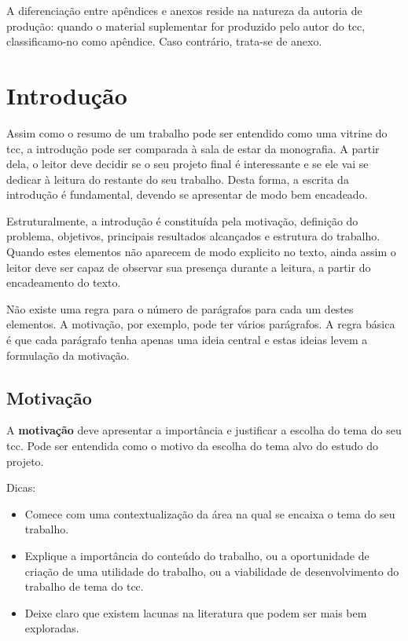 \documentclass{eic-bcc-tcc}
\begin{document}
A diferenciação entre apêndices e anexos reside na natureza da autoria de produção: quando o material suplementar for produzido pelo autor do \gls{tcc}, classificamo-no como apêndice. Caso contrário, trata-se de anexo.


\chapter{Introdução}
\label{cha:introducao}

Assim como o resumo de um trabalho pode ser entendido como uma vitrine do \gls{tcc}, a introdução pode ser comparada à sala de estar da monografia. A partir dela, o leitor deve decidir se o seu projeto final é interessante e se ele vai se dedicar à leitura do restante do seu trabalho. Desta forma, a escrita da introdução é fundamental, devendo se apresentar de modo bem encadeado.

Estruturalmente, a introdução é constituída pela motivação, definição do problema, objetivos, principais resultados alcançados e estrutura do trabalho. Quando estes elementos não aparecem de modo explicito no texto, ainda assim o leitor deve ser capaz de observar sua presença durante a leitura, a partir do encadeamento do texto.

Não existe uma regra para o número de parágrafos para cada um destes elementos. A motivação, por exemplo, pode ter vários parágrafos. A regra básica é que cada parágrafo tenha apenas uma ideia central e estas ideias levem a formulação da motivação.

\section{Motivação}

A \textbf{motivação} deve apresentar a importância e justificar a escolha do tema do seu \gls{tcc}. Pode ser entendida como o motivo da escolha do tema alvo do estudo do projeto. 

Dicas:
\begin{itemize}
    \item Comece com uma contextualização da área na qual se encaixa o tema do seu trabalho.
    \item Explique a importância do conteúdo do trabalho, ou a oportunidade de criação de uma utilidade do trabalho, ou a viabilidade de desenvolvimento do trabalho de tema do \gls{tcc}.
    \item Deixe claro que existem lacunas na literatura que podem ser mais bem exploradas.
\end{itemize}
\end{document}
